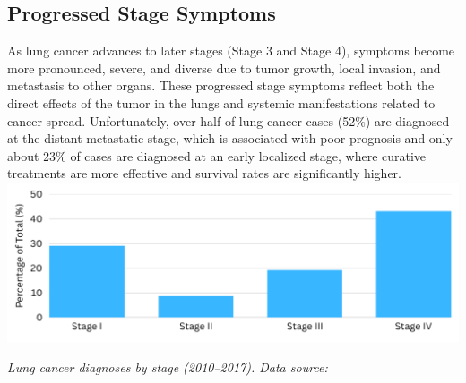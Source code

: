 \subsection{Progressed Stage Symptoms}

As lung cancer advances to later stages (Stage 3 and Stage 4), symptoms become more pronounced, 
severe, and diverse due to tumor growth, local invasion, and metastasis to other organs. These 
progressed stage symptoms reflect both the direct effects of the tumor in the lungs and systemic 
manifestations related to cancer spread. Unfortunately, over half of lung cancer cases (52\%) are 
diagnosed at the distant metastatic stage, which is associated with poor prognosis and only about 
23\% of cases are diagnosed at an early localized stage, where curative treatments are more 
effective and survival rates are significantly higher.\\

\includegraphics[width=\textwidth]{../assets/03-clinical/stages-diagnosis.png}  

\begin{center}
    \textit{Lung cancer diagnoses by stage (2010--2017). Data source:\cite{jco2022}}
\end{center}

